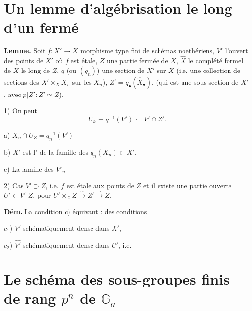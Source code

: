 \documentclass[11pt,a4paper]{article}
\begin{document}
\section*{Un lemme d'algébrisation le long d'un fermé}



\textbf{Lemme.} Soit $f : X' \to X$ morphisme   type fini
de schémas noethériens, $V'$ l'ouvert des points de $X'$ où $f$ est étale, $Z$ une
partie fermée de $X$, $\hat{X}$ le complété formel de $X$ le long de $Z$,
$q$ (ou $(q_n)$) une section  de $X'$ sur $X$ \ill{}
(i.e. une collection de sections des $X'\times_X X_n$ sur les $X_n$),
$Z' = q_\bullet(\hat{X}_\bullet)$, 
(qui est une sous-section \ill{} de $X'$ \ill{}, avec $p|Z' : Z' \simeq Z$).

1) On peut \ill{}
\[
  U_Z = q^{-1}(V') \longleftarrow V' \cap Z' .
\]

a) $X_n \cap U_Z = q_n^{-1}(V')$ 

b) $X'$ est l' \ill{} de la famille des
$q_n(X_n) \subset X'$, \ill{}

c) La famille des $V'_n$ \add{(}\add{)}

2) Cas  $V' \supset Z$, i.e. $f$ est étale aux points de $Z$
\supplied{(}et il existe une partie ouverte $U' \subset V'$  $Z$,
\ill{} pour  $U'\times_X Z \xrightarrow{\ \sim\ } Z' \xrightarrow{\ \sim\ } Z$.

\textbf{Dém.} 
La condition c) équivaut : \ill{} des conditions

$c_1$) $V'$ schématiquement dense dans $X'$,

$c_2$) $\hat{V'}$ schématiquement dense dans $U'$, i.e.\ill{}

\section*{Le schéma des sous-groupes finis de rang $p^n$ de $\mathbb{G}_a$}
\end{document}
